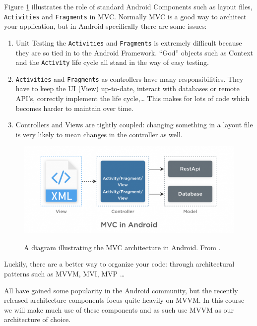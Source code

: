 Figure \ref{fig:MVCdiagram} illustrates the role of standard Android Components such as layout files, \lstinline!Activities! and \lstinline!Fragments! in MVC.
Normally MVC is a good way to architect your application, but in Android specifically there are some issues:

\begin{enumerate}
	\item Unit Testing the \lstinline!Activities! and \lstinline!Fragments! is extremely difficult because they are so tied in to the Android Framework.
	``God'' objects such as Context and the \lstinline!Activity! life cycle all stand in the way of easy testing.
	\item \lstinline!Activities! and \lstinline!Fragments! as controllers have many responsibilities. 
	They have to keep the UI (View) up-to-date, interact with databases or remote API's, correctly implement the life cycle,\ldots
	This makes for lots of code which becomes harder to maintain over time.
	\item Controllers and Views are tightly coupled: changing something in a layout file is very likely to mean changes in the controller as well. 
\end{enumerate}

\begin{figure}[ht]
	\centering
	\includegraphics[width=\textwidth]{images/mvvm/MVC_diagram.png}
	\label{fig:MVCdiagram}
	\caption{A diagram illustrating the MVC architecture in Android. From \cite{simform}.}
\end{figure}

Luckily, there are a better way to organize your code: through architectural patterns such as MVVM, MVI, MVP \ldots

All have gained some popularity in the Android community, but the recently released architecture components \cite{architectureComponents} focus quite heavily on MVVM.
In this course we will make much use of these components and as such use MVVM as our architecture of choice.


